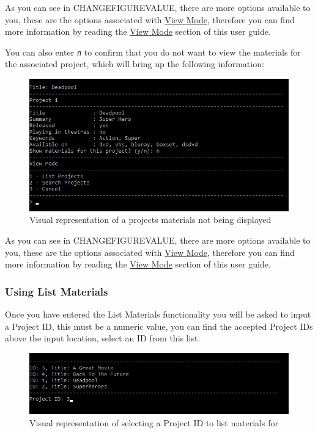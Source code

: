 \documentclass[
  english,
  a4paper,
,tablecaptionabove
]{scrartcl}
\begin{document}
As you can see in CHANGEFIGUREVALUE, there are more options available to
you, these are the options associated with
\protect\hyperlink{using-view-mode}{View Mode}, therefore you can find
more information by reading the \protect\hyperlink{using-view-mode}{View
Mode} section of this user guide.

You can also enter \emph{\texttt{n}} to confirm that you do not want to
view the materials for the associated project, which will bring up the
following information:

\begin{figure}
\centering
\includegraphics{images/user-guide/view-mode/project-search-materials-decline.png}
\caption{Visual representation of a projects materials not being
displayed}
\end{figure}

As you can see in CHANGEFIGUREVALUE, there are more options available to
you, these are the options associated with
\protect\hyperlink{using-view-mode}{View Mode}, therefore you can find
more information by reading the \protect\hyperlink{using-view-mode}{View
Mode} section of this user guide.

\newpage

\hypertarget{using-list-materials}{%
\subsubsection{Using List Materials}\label{using-list-materials}}

Once you have entered the List Materials functionality you will be asked
to input a Project ID, this must be a numeric value, you can find the
accepted Project IDs above the input location, select an ID from this
list.

\begin{figure}
\centering
\includegraphics{images/user-guide/view-mode/list-materials-project-id.png}
\caption{Visual representation of selecting a Project ID to list
materials for}
\end{figure}
\end{document}
